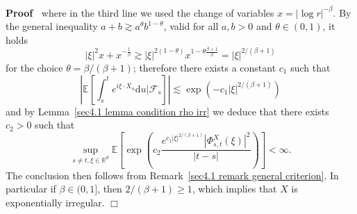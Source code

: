 \documentclass[10pt]{article}
\newcommand{\mathd}{\mathrm{d}}
\newcommand{\nobracket}{}
\newenvironment{proof}{\noindent\textbf{Proof\ }}{\hspace*{\fill}$\Box$\medskip}
\begin{document}
\begin{proof}
  where in the third line we used the change of variables $x = | \log r |^{-
  \beta}$. By the general inequality $a + b \gtrsim a^{\theta} b^{1 -
  \theta}$, valid for all $a, b > 0$ and $\theta \in (0, 1)$, it holds
  \[ | \xi |^2 x + x^{- \frac{1}{\beta}} \gtrsim | \xi |^{2 (1 - \theta)} x^{1
     - \theta \frac{\beta + 1}{\beta}} = | \xi |^{2 / (\beta + 1)} \]
  for the choice $\theta = \beta / (\beta + 1)$; therefore there exists a
  constant $c_1$ such that
  \[ \left| \mathbb{E} \left[ \int_s^t e^{i \xi \cdot X_u} \mathd u |
     \mathcal{F}_s \nobracket \right] \right| \lesssim \exp (- c_1 | \xi |^{2
     / (\beta + 1)}) \]
  and by Lemma~\ref{sec4.1 lemma condition rho irr} we deduce that there
  exists $c_2 > 0$ such that
  \[ \sup_{s \neq t, \xi \in \mathbb{R}^d} \mathbb{E} \left[ \exp \left( c_2 
     \frac{e^{c_1 | \xi |^{2 / (\beta + 1)}} | \Phi_{s, t}^X (\xi) |^2}{| t -
     s |} \right) \right] < \infty . \]
  The conclusion then follows from Remark~\ref{sec4.1 remark general
  criterion}. In particular if $\beta \in (0, 1]$, then $2 / (\beta + 1)
  \geqslant 1$, which implies that $X$ is exponentially irregular.
\end{proof}
\end{document}
